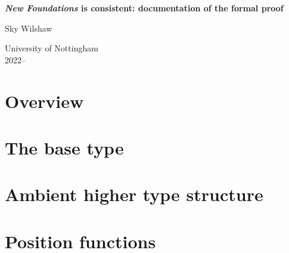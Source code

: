 \documentclass{book}
\begin{document}

\begin{titlepage}
	\begin{center}
		\vspace*{1cm}

		\Huge
		\textbf{\emph{New Foundations} is consistent: documentation of the formal proof}

		\vspace{0.5cm}
		\LARGE
		Sky Wilshaw

		\vfill

		\Large
		University of Nottingham\\
		2022--\the\year{}

	\end{center}
\end{titlepage}

\dominitoc{}

\setcounter{tocdepth}{1}
\tableofcontents
\newpage
\setcounter{tocdepth}{3}

\chapter{Overview}



\chapter{The base type}

\minitoc









\chapter{Ambient higher type structure}

\minitoc






\chapter{Position functions}
\end{document}
